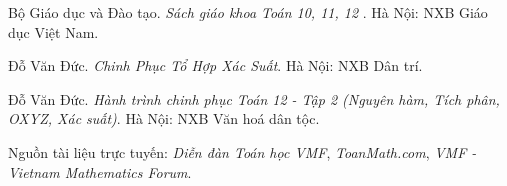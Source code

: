 \documentclass[12pt, a4paper]{article}
\begin{document}
		\vspace{0.5cm}
		
		\begin{enumerate}[label=\textbf{[\arabic*]}, leftmargin=*, itemsep=0.3cm]
			\item Bộ Giáo dục và Đào tạo. \textit{Sách giáo khoa Toán 10, 11, 12 }. Hà Nội: NXB Giáo dục Việt Nam.
			
			\item Đỗ Văn Đức. \textit{Chinh Phục Tổ Hợp Xác Suất}. Hà Nội: NXB Dân trí.
			
			\item Đỗ Văn Đức. \textit{Hành trình chinh phục Toán 12 - Tập 2 (Nguyên hàm, Tích phân, OXYZ, Xác suất)}. Hà Nội: NXB Văn hoá dân tộc.
			
			\item Nguồn tài liệu trực tuyến: \textit{Diễn đàn Toán học VMF}, \textit{ToanMath.com}, \textit{VMF - Vietnam Mathematics Forum}.
			
			
		\end{enumerate}
\end{document}
